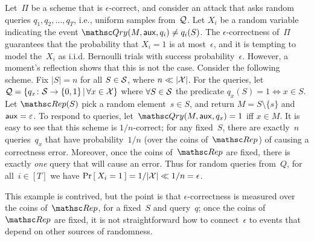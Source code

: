 \def\bin{{\sf Bin}}
Let~$\Pi$ be a scheme that is $\epsilon$-correct, and consider an attack that 
asks random queries $q_1,q_2,\ldots,q_T$, i.e., uniform samples from~${\cal Q}$.
Let $X_i$ be a random variable indicating the event $\Qry(M,\aux,q_i)\neq q_i(S)$.  
The $\epsilon$-correctness of~$\Pi$ guarantees that the probability that $X_i=1$ is at most~$\epsilon$, 
and it is tempting to model the~$X_i$ as i.i.d. Bernoulli trials with success probability~$\epsilon$.
However, a moment's reflection shows that this is not the case.  Consider the following scheme.  Fix $|S|=n$ for all $S \in {\cal S}$, where $n \ll |{\cal X}|$.  For the queries, let ${\cal Q} = \{q_x\colon {\cal S} \to \{0,1\} \,|\, \forall x \in {\cal X}\}$ where $\forall S \in {\cal S}$ the predicate $q_x(S)=1 \Leftrightarrow x \in S$.  Let $\Rep(S)$ pick a random element~$s \in S$, and return $M = S \setminus \{s\}$ and ${\sf aux} = \varepsilon$.  To respond to queries, let~$\Qry(M,\aux,q_x)=1$ iff $x \in M$.  It is easy to see that this scheme is $1/n$-correct; for any fixed~$S$, there are exactly~$n$ queries~$q_x$ that have probability~$1/n$  (over the coins of~$\Rep$) of causing a correctness error.  Moreover, once the coins of~$\Rep$ are fixed, there is exactly \emph{one} query that will cause an error.  Thus for random queries from~$Q$, for all~$i\in[T]$ we have $\Pr\left[\: X_i=1 \:\right]=1/|{\cal X}| \ll 1/n = \epsilon$.

This example is contrived, but the point is that $\epsilon$-correctness is measured over the coins of~$\Rep$, for a fixed~$S$ and query~$q$; once the coins of~$\Rep$ are fixed, it is not straightforward how to connect~$\epsilon$ to events that depend on other sources of randomness. 


